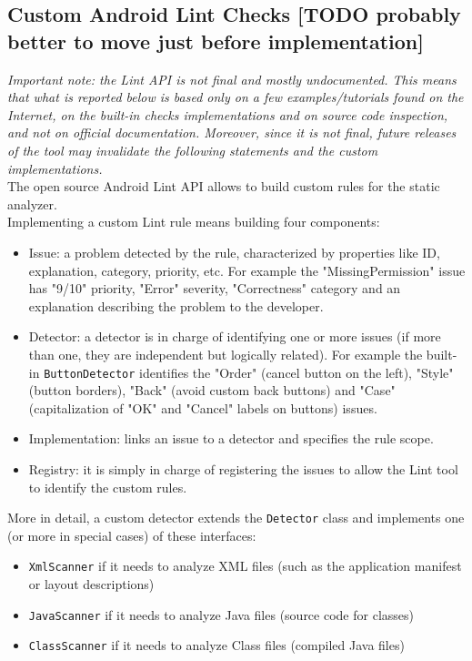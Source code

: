 \documentclass[11pt,a4paper,notitlepage]{article}
\begin{document}
\subsection{Custom Android Lint Checks [TODO probably better to move just before implementation]}
\textit{Important note: the Lint API is not final and mostly undocumented. This means that what is reported below is based only on a few examples/tutorials found on the Internet, on the built-in checks implementations and on source code inspection, and not on official documentation. Moreover, since it is not final, future releases of the tool may invalidate the following statements and the custom implementations.}\bigskip \\
The open source Android Lint API allows to build custom rules for the static analyzer.\medskip \\
Implementing a custom Lint rule means building four components:
\begin{itemize}
	\item Issue: a problem detected by the rule, characterized by properties like ID, explanation, category, priority, etc. For example the "MissingPermission" issue has "9/10" priority, "Error" severity, "Correctness" category and an explanation describing the problem to the developer.
	\item Detector: a detector is in charge of identifying one or more issues (if more than one, they are independent but logically related). For example the built-in \texttt{ButtonDetector} identifies the "Order" (cancel button on the left), "Style" (button borders), "Back" (avoid custom back buttons) and "Case" (capitalization of "OK" and "Cancel" labels on buttons) issues.
	\item Implementation: links an issue to a detector and specifies the rule scope.
	\item Registry: it is simply in charge of registering the issues to allow the Lint tool to identify the custom rules.
\end{itemize}\bigskip
More in detail, a custom detector extends the \texttt{Detector} class and implements one (or more in special cases) of these interfaces:
\begin{itemize}
	\item \texttt{XmlScanner} if it needs to analyze XML files (such as the application manifest or layout descriptions)
	\item \texttt{JavaScanner} if it needs to analyze Java files (source code for classes)
	\item \texttt{ClassScanner} if it needs to analyze Class files (compiled Java files)
\end{itemize}
\end{document}
